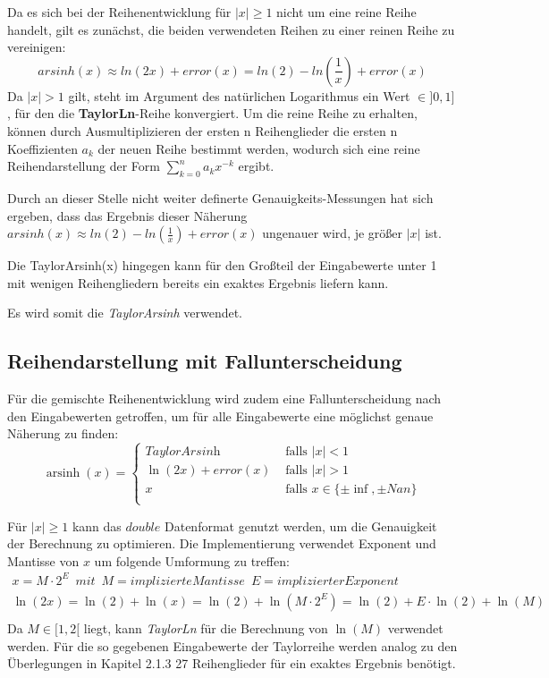 \documentclass[course=erap] {aspdoc}
\begin{document}
    Da es sich bei der Reihenentwicklung für $|x|\geq1$ nicht um eine reine Reihe handelt, gilt es zunächst, die beiden verwendeten Reihen zu einer reinen Reihe zu vereinigen:
    \[
        arsinh(x)\approx ln(2x) + error(x) = ln(2) - ln(\frac{1}{x}) + error(x)
    \]
    Da $|x|>1$ gilt, steht im Argument des natürlichen Logarithmus ein Wert $\in ]0, 1]$, für den die \textbf{TaylorLn}-Reihe konvergiert.
    Um die reine Reihe zu erhalten, können durch Ausmultiplizieren der ersten n Reihenglieder die ersten n Koeffizienten $a_k$ der neuen Reihe bestimmt werden, wodurch sich eine reine Reihendarstellung der Form $\sum_{k=0}^{n} a_k x^{-k}$ ergibt.

    Durch an dieser Stelle nicht weiter definerte Genauigkeits-Messungen hat sich ergeben, dass das Ergebnis dieser Näherung $ arsinh(x)\approx ln(2) - ln(\frac{1}{x}) + error(x)$ ungenauer wird, je größer $|x|$ ist.

    Die TaylorArsinh(x) hingegen kann für den Großteil der Eingabewerte unter 1 mit wenigen Reihengliedern bereits ein exaktes Ergebnis liefern kann.

    Es wird somit die \textit{TaylorArsinh} verwendet.


    \subsection{Reihendarstellung mit Fallunterscheidung}\label{subsec:reihendarstellung-mit-fallunterscheidung}

    Für die gemischte Reihenentwicklung wird zudem eine Fallunterscheidung nach den Eingabewerten getroffen, um für alle Eingabewerte eine möglichst genaue Näherung zu finden:
    \[ \operatorname{arsinh}(x) =
    \begin{cases}
        \textit{TaylorArsinh}     & \text{ falls } |x| < 1 \\
        \ln(2x) + error(x)  & \text{ falls } |x| >1 \\
        x     & \text{ falls } x \in \{\pm\inf, \pm Nan\}\\
    \end{cases}\]

    Für $|x|\geq1$ kann das $double$ Datenformat genutzt werden, um die Genauigkeit der Berechnung zu optimieren.
    Die Implementierung verwendet Exponent und Mantisse von $x$ um folgende Umformung zu treffen:
    \begin{gather*}
        x = M\cdot2^E \,\,\, mit \,\,\, M = implizierte Mantisse \,\,\, E = implizierter Exponent\\
        \ln(2x) = \ln(2) + \ln(x) = \ln(2) + \ln(M\cdot2^E) = \ln(2) + E\cdot\ln(2) + \ln(M)\\
    \end{gather*}
    Da $M\in[1, 2[$ liegt, kann \textit{TaylorLn} für die Berechnung von $\ln(M)$ verwendet werden.
    Für die so gegebenen Eingabewerte der Taylorreihe werden analog zu den Überlegungen in Kapitel 2.1.3 27 Reihenglieder für ein exaktes Ergebnis benötigt.
\end{document}
